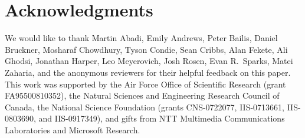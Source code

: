 \section*{Acknowledgments}
We would like to thank Martin Abadi, Emily Andrews, Peter Bailis, Daniel
Bruckner, Mosharaf Chowdhury, Tyson Condie, Sean Cribbs, Alan Fekete, Ali
Ghodsi, Jonathan Harper, Leo Meyerovich, Josh Rosen, Evan R.\ Sparks, Matei
Zaharia, and the anonymous reviewers for their helpful feedback on this paper.
This work was supported by the Air Force Office of Scientific Research (grant
FA95500810352), the Natural Sciences and Engineering Research Council of Canada,
the National Science Foundation (grants CNS-0722077, IIS-0713661, IIS-0803690,
and IIS-0917349), and gifts from NTT Multimedia Communications Laboratories and
Microsoft Research.
